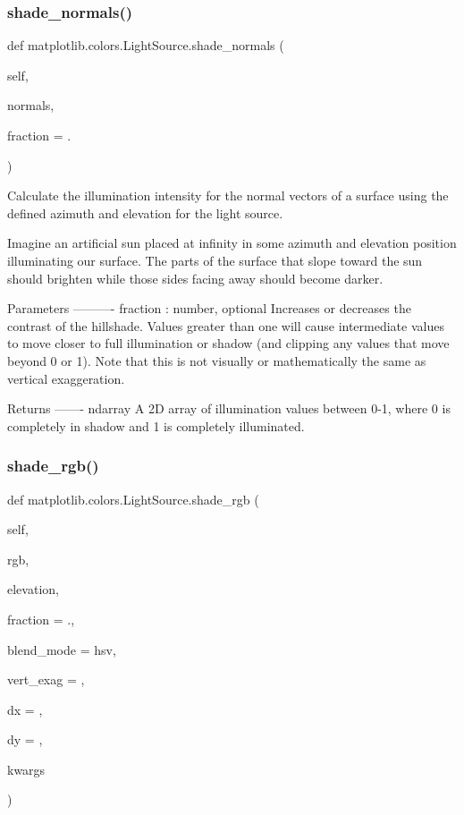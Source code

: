 \subsubsection{\texorpdfstring{shade\+\_\+normals()}{shade\_normals()}}
{\footnotesize\ttfamily def matplotlib.\+colors.\+Light\+Source.\+shade\+\_\+normals (\begin{DoxyParamCaption}\item[{}]{self,  }\item[{}]{normals,  }\item[{}]{fraction = {.} }\end{DoxyParamCaption})}

\begin{DoxyVerb}Calculate the illumination intensity for the normal vectors of a
surface using the defined azimuth and elevation for the light source.

Imagine an artificial sun placed at infinity in some azimuth and
elevation position illuminating our surface. The parts of the surface
that slope toward the sun should brighten while those sides facing away
should become darker.

Parameters
----------
fraction : number, optional
    Increases or decreases the contrast of the hillshade.  Values
    greater than one will cause intermediate values to move closer to
    full illumination or shadow (and clipping any values that move
    beyond 0 or 1). Note that this is not visually or mathematically
    the same as vertical exaggeration.

Returns
-------
ndarray
    A 2D array of illumination values between 0-1, where 0 is
    completely in shadow and 1 is completely illuminated.
\end{DoxyVerb}
 \mbox{\label{classmatplotlib_1_1colors_1_1LightSource_a0da23fa89436a964e61cedab112b47af}} 
\subsubsection{\texorpdfstring{shade\+\_\+rgb()}{shade\_rgb()}}
{\footnotesize\ttfamily def matplotlib.\+colors.\+Light\+Source.\+shade\+\_\+rgb (\begin{DoxyParamCaption}\item[{}]{self,  }\item[{}]{rgb,  }\item[{}]{elevation,  }\item[{}]{fraction = {.},  }\item[{}]{blend\+\_\+mode = {\ttfamily \textquotesingle{}hsv\textquotesingle{}},  }\item[{}]{vert\+\_\+exag = {},  }\item[{}]{dx = {},  }\item[{}]{dy = {},  }\item[{}]{kwargs }\end{DoxyParamCaption})}


